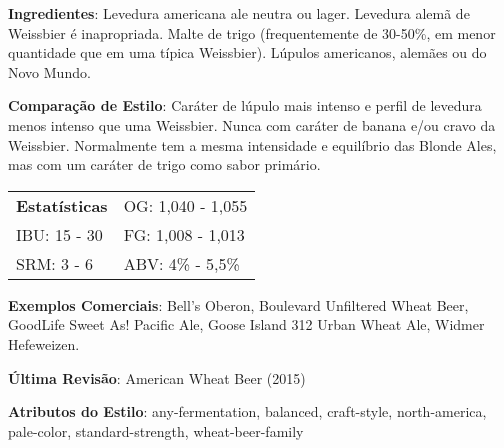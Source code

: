 \textbf{Ingredientes}: Levedura americana ale neutra ou lager. Levedura alemã de Weissbier é inapropriada. Malte de trigo (frequentemente de 30-50\%, em menor quantidade que em uma típica Weissbier). Lúpulos americanos, alemães ou do Novo Mundo.

\textbf{Comparação de Estilo}: Caráter de lúpulo mais intenso e perfil de levedura menos intenso que uma Weissbier. Nunca com caráter de banana e/ou cravo da Weissbier. Normalmente tem a mesma intensidade e equilíbrio das Blonde Ales, mas com um caráter de trigo como sabor primário.

\begin{tabular}{@{}p{35mm}p{35mm}@{}}
  \textbf{Estatísticas} & OG: 1,040 - 1,055 \\
  IBU: 15 - 30  & FG: 1,008 - 1,013 \\
  SRM: 3 - 6  & ABV: 4\% - 5,5\%
\end{tabular}

\textbf{Exemplos Comerciais}: Bell’s Oberon, Boulevard Unfiltered Wheat Beer, GoodLife Sweet As! Pacific Ale, Goose Island 312 Urban Wheat Ale, Widmer Hefeweizen.

\textbf{Última Revisão}: American Wheat Beer (2015)

\textbf{Atributos do Estilo}: any-fermentation, balanced, craft-style, north-america, pale-color, standard-strength, wheat-beer-family
